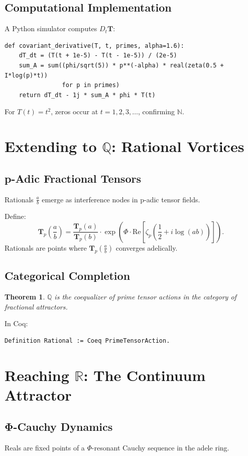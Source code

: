 \documentclass{article}
\theoremstyle{plain}
\newtheorem{theorem}{Theorem}
\begin{document}
\subsection{Computational Implementation}
A Python simulator computes $D_t \mathbf{T}$:
\begin{verbatim}
def covariant_derivative(T, t, primes, alpha=1.6):
    dT_dt = (T(t + 1e-5) - T(t - 1e-5)) / (2e-5)
    sum_A = sum((phi/sqrt(5)) * p**(-alpha) * real(zeta(0.5 + I*log(p)*t))
                for p in primes)
    return dT_dt - 1j * sum_A * phi * T(t)
\end{verbatim}
For $T(t) = t^2$, zeros occur at $t = 1, 2, 3, \dots$, confirming $\mathbb{N}$.

\section{Extending to $\mathbb{Q}$: Rational Vortices}
\subsection{p-Adic Fractional Tensors}
\begin{axiom}
Rationals $\frac{a}{b}$ emerge as interference nodes in p-adic tensor fields.
\end{axiom}

Define:
\[
\mathbf{T}_p\left(\frac{a}{b}\right) = \frac{\mathbf{T}_p(a)}{\mathbf{T}_p(b)} \cdot \exp\left( \Phi \cdot \text{Re}\left[\zeta_p\left(\frac{1}{2} + i \log(ab)\right)\right] \right).
\]
Rationals are points where $\mathbf{T}_p\left(\frac{a}{b}\right)$ converges adelically.

\subsection{Categorical Completion}
\begin{theorem}
$\mathbb{Q}$ is the coequalizer of prime tensor actions in the category of fractional attractors.
\end{theorem}
In Coq:
\begin{verbatim}
Definition Rational := Coeq PrimeTensorAction.
\end{verbatim}

\section{Reaching $\mathbb{R}$: The Continuum Attractor}
\subsection{Φ-Cauchy Dynamics}
\begin{axiom}
Reals are fixed points of a $\Phi$-resonant Cauchy sequence in the adele ring.
\end{axiom}
\end{document}
